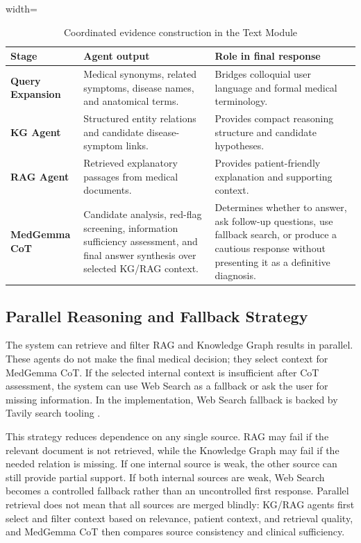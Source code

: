 \begin{table}[H]
\centering
\begin{adjustbox}{width=\textwidth}
\begin{tabular}{>{\RaggedRight\arraybackslash}p{} >{\RaggedRight\arraybackslash}p{} >{\RaggedRight\arraybackslash}p{}}
\hline\hline
\textbf{Stage} & \textbf{Agent output} & \textbf{Role in final response} \\
\hline
\textbf{Query Expansion} & Medical synonyms, related symptoms, disease names, and anatomical terms. & Bridges colloquial user language and formal medical terminology. \\
\textbf{KG Agent} & Structured entity relations and candidate disease-symptom links. & Provides compact reasoning structure and candidate hypotheses. \\
\textbf{RAG Agent} & Retrieved explanatory passages from medical documents. & Provides patient-friendly explanation and supporting context. \\
\textbf{MedGemma CoT} & Candidate analysis, red-flag screening, information sufficiency assessment, and final answer synthesis over selected KG/RAG context. & Determines whether to answer, ask follow-up questions, use fallback search, or produce a cautious response without presenting it as a definitive diagnosis. \\
\hline\hline
\end{tabular}
\end{adjustbox}
\caption{Coordinated evidence construction in the Text Module}
\label{table:text-evidence-construction}
\end{table}

\subsection{Parallel Reasoning and Fallback Strategy}

The system can retrieve and filter RAG and Knowledge Graph results in parallel. These agents do not make the final medical decision; they select context for MedGemma CoT. If the selected internal context is insufficient after CoT assessment, the system can use Web Search as a fallback or ask the user for missing information. In the implementation, Web Search fallback is backed by Tavily search tooling \cite{tavily_search}.

This strategy reduces dependence on any single source. RAG may fail if the relevant document is not retrieved, while the Knowledge Graph may fail if the needed relation is missing. If one internal source is weak, the other source can still provide partial support. If both internal sources are weak, Web Search becomes a controlled fallback rather than an uncontrolled first response. Parallel retrieval does not mean that all sources are merged blindly: KG/RAG agents first select and filter context based on relevance, patient context, and retrieval quality, and MedGemma CoT then compares source consistency and clinical sufficiency.

